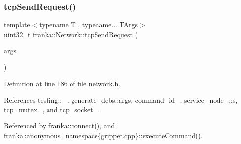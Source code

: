 \subsubsection{\texorpdfstring{tcp\+Send\+Request()}{tcpSendRequest()}}
{\footnotesize\ttfamily template$<$typename T , typename... T\+Args$>$ \\
uint32\+\_\+t franka\+::\+Network\+::tcp\+Send\+Request (\begin{DoxyParamCaption}\item[{T\+Args \&\&...}]{args }\end{DoxyParamCaption})}



Definition at line 186 of file network.\+h.



References testing\+::\+\_\+, generate\+\_\+debs\+::args, command\+\_\+id\+\_\+, service\+\_\+node\+\_\+::s, tcp\+\_\+mutex\+\_\+, and tcp\+\_\+socket\+\_\+.



Referenced by franka\+::connect(), and franka\+::anonymous\+\_\+namespace\{gripper.\+cpp\}\+::execute\+Command().


